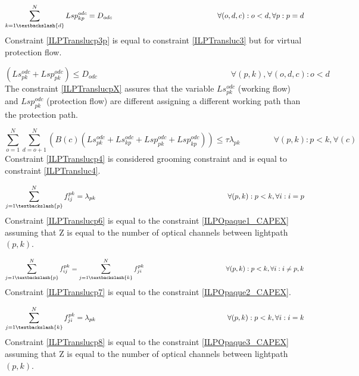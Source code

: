 \begin{equation}
\sum_{k=1\textbackslash \{d\}}^{N} Lsp_{kp}^{odc} = D_{odc} \qquad \qquad \qquad \qquad \qquad \qquad \qquad
\forall(o,d,c) : o < d, \forall p: p = d
\label{ILPTranslucp3p}
\end{equation}
\noindent
Constraint \ref{ILPTranslucp3p} is equal to constraint \ref{ILPTransluc3} but for virtual protection flow.

\begin{equation}
(Ls_{pk}^{odc} + Lsp_{pk}^{odc}) \leq D_{odc} \qquad \qquad \qquad \qquad \qquad \qquad \qquad \qquad
\forall (p,k), \forall(o,d,c) : o < d
\label{ILPTranslucpX}
\end{equation}
\noindent
The constraint \ref{ILPTranslucpX} assures that the variable $Ls_{pk}^{odc}$ (working flow) and $Lsp_{pk}^{odc}$ (protection flow) are different assigning a different working path than the protection path.

\begin{equation}
\sum_{o=1}^{N} \sum_{d=o+1}^{N} (B(c)(Ls_{pk}^{odc} + Ls_{kp}^{odc} + Lsp_{pk}^{odc} + Lsp_{kp}^{odc})) \leq  \tau \lambda_{pk} \qquad \qquad
\forall (p,k) : p < k, \forall (c)
\label{ILPTranslucp4}
\end{equation}
\noindent
Constraint \ref{ILPTranslucp4} is considered grooming constraint and is equal to constraint \ref{ILPTransluc4}.

\begin{equation}
\sum_{j=1\textbackslash \{p\}}^{N} f_{ij}^{pk} = \lambda_{pk}  \qquad \qquad \qquad \qquad \qquad \qquad \qquad \qquad \qquad
\forall(p,k) : p < k, \forall i: i = p
\label{ILPTranslucp6}
\end{equation}
\noindent
Constraint \ref{ILPTranslucp6} is equal to the constraint \ref{ILPOpaque1_CAPEX} assuming that Z is equal to the number of optical channels between lightpath $(p,k)$.

\begin{equation}
\sum_{j=1\textbackslash \{p\}}^{N} f_{ij}^{pk} = \sum_{j=1\textbackslash \{k\}}^{N} f_{ji}^{pk} \qquad \qquad \qquad \qquad \qquad \qquad
\forall(p,k) : p < k, \forall i: i \neq p,k
\label{ILPTranslucp7}
\end{equation}
\noindent
Constraint \ref{ILPTranslucp7} is equal to the constraint \ref{ILPOpaque2_CAPEX}.

\begin{equation}
\sum_{j=1\textbackslash \{k\}}^{N} f_{ji}^{pk} = \lambda_{pk}  \qquad \qquad \qquad \qquad \qquad \qquad \qquad \qquad \qquad
\forall(p,k) : p < k, \forall i: i = k
\label{ILPTranslucp8}
\end{equation}
\noindent
Constraint \ref{ILPTranslucp8} is equal to the constraint \ref{ILPOpaque3_CAPEX} assuming that Z is equal to the number of optical channels between lightpath $(p,k)$.

